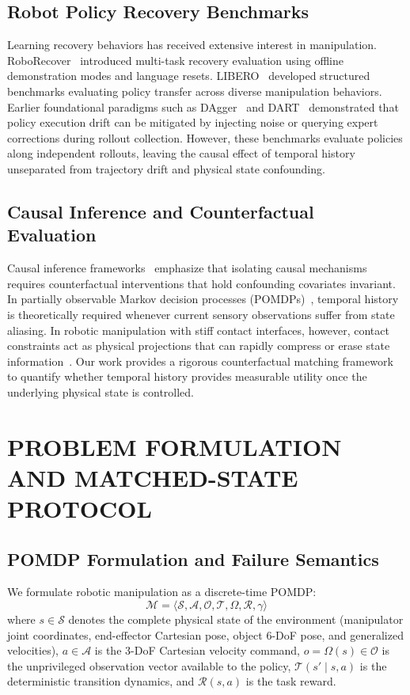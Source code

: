 \documentclass[letterpaper, 10 pt, conference]{ieeeconf}
\begin{document}
\subsection{Robot Policy Recovery Benchmarks}
Learning recovery behaviors has received extensive interest in manipulation. RoboRecover~\cite{liu2024roborecover} introduced multi-task recovery evaluation using offline demonstration modes and language resets. LIBERO~\cite{liu2023libero} developed structured benchmarks evaluating policy transfer across diverse manipulation behaviors. Earlier foundational paradigms such as DAgger~\cite{ross2011reduction} and DART~\cite{laskey2017dart} demonstrated that policy execution drift can be mitigated by injecting noise or querying expert corrections during rollout collection. However, these benchmarks evaluate policies along independent rollouts, leaving the causal effect of temporal history unseparated from trajectory drift and physical state confounding.

\subsection{Causal Inference and Counterfactual Evaluation}
Causal inference frameworks~\cite{pearl2009causality} emphasize that isolating causal mechanisms requires counterfactual interventions that hold confounding covariates invariant. In partially observable Markov decision processes (POMDPs)~\cite{kaelbling1998planning}, temporal history is theoretically required whenever current sensory observations suffer from state aliasing. In robotic manipulation with stiff contact interfaces, however, contact constraints act as physical projections that can rapidly compress or erase state information~\cite{mandlekar2021what, chi2023diffusionpolicy}. Our work provides a rigorous counterfactual matching framework to quantify whether temporal history provides measurable utility once the underlying physical state is controlled.

\section{PROBLEM FORMULATION AND MATCHED-STATE PROTOCOL}
\label{sec:methodology}

\subsection{POMDP Formulation and Failure Semantics}
We formulate robotic manipulation as a discrete-time POMDP:
\begin{equation}
\mathcal{M} = \langle \mathcal{S}, \mathcal{A}, \mathcal{O}, \mathcal{T}, \Omega, \mathcal{R}, \gamma \rangle
\end{equation}
where $s \in \mathcal{S}$ denotes the complete physical state of the environment (manipulator joint coordinates, end-effector Cartesian pose, object 6-DoF pose, and generalized velocities), $a \in \mathcal{A}$ is the 3-DoF Cartesian velocity command, $o = \Omega(s) \in \mathcal{O}$ is the unprivileged observation vector available to the policy, $\mathcal{T}(s' \mid s, a)$ is the deterministic transition dynamics, and $\mathcal{R}(s, a)$ is the task reward.
\end{document}
